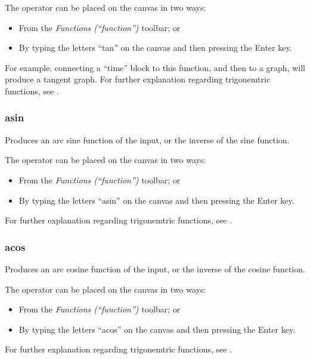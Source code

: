 The operator can be placed on the canvas in two ways:
\begin{itemize}
\item From the \emph{Functions (``function'')} toolbar; or 
\item By typing the letters ``tan'' on the canvas and then pressing the
Enter key.
\end{itemize}
For example, connecting a ``time'' block to this function, and then
to a graph, will produce a tangent graph. For further explanation
regarding trigonemtric functions, see .

\subsubsection{asin}


\label{Operation:asin} Produces an arc sine function of the input,
or the inverse of the sine function.

The operator can be placed on the canvas in two ways:
\begin{itemize}
\item From the \emph{Functions (``function'')} toolbar; or 
\item By typing the letters ``asin'' on the canvas and then pressing the
Enter key.
\end{itemize}
For further explanation regarding trigonemtric functions, see .

\subsubsection{acos}


\label{Operation:acos} Produces an arc cosine function of the input,
or the inverse of the cosine function.

The operator can be placed on the canvas in two ways:
\begin{itemize}
\item From the \emph{Functions (``function'')} toolbar; or 
\item By typing the letters ``acos'' on the canvas and then pressing the
Enter key.
\end{itemize}
For further explanation regarding trigonemtric functions, see .

